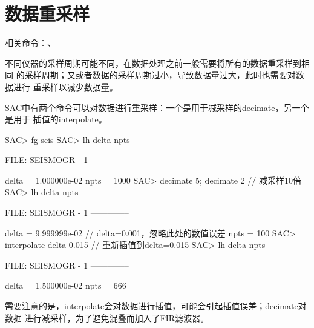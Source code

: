 \section{数据重采样}
相关命令：、

不同仪器的采样周期可能不同，在数据处理之前一般需要将所有的数据重采样到相同
的采样周期；又或者数据的采样周期过小，导致数据量过大，此时也需要对数据进行
重采样以减少数据量。

SAC中有两个命令可以对数据进行重采样：一个是用于减采样的decimate，另一个是用于
插值的interpolate。

\begin{SACCode}
SAC> fg seis
SAC> lh delta npts
  
  FILE: SEISMOGR - 1
 --------------

     delta = 1.000000e-02
      npts = 1000
SAC> decimate 5; decimate 2     // 减采样10倍
SAC> lh delta npts
  
  FILE: SEISMOGR - 1
 --------------

     delta = 9.999999e-02       // delta=0.001，忽略此处的数值误差
      npts = 100
SAC> interpolate delta 0.015    // 重新插值到delta=0.015
SAC> lh delta npts
  
  FILE: SEISMOGR - 1
 --------------

     delta = 1.500000e-02
      npts = 666
\end{SACCode}

需要注意的是，interpolate会对数据进行插值，可能会引起插值误差；decimate对数据
进行减采样，为了避免混叠而加入了FIR滤波器。
